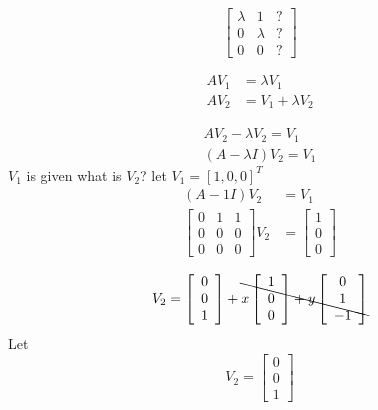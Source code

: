 \documentclass[12pt,a4paper]{article}
\begin{document}
$$
\left[\begin{array}{lll}
{\lambda} & {1} & ?\\ 
{0} & {\lambda}&  ?\\ 
{0} & {0} &? 
\end{array}\right]
$$

\begin{align*}
A V_{1}&=\lambda V_{1} \\
 A V_{2}&=V_{1}+\lambda V_{2}
\end{align*}

\begin{equation*}
\begin{array}{l}{A V_{2}-\lambda V_{2}=V_{1}} \\ {(A-\lambda I) V_{2}=V_{1}}\end{array}
\end{equation*}
$V_1$ is given what is $V_2$? let $V_1=[1,0,0]^T$
\begin{align*}
(A-1 I) V_{2}&=V_{1}\\
\left[\begin{array}{lll}{0} & {1} & {1} \\ {0} & {0} & {0} \\ {0} & {0} & {0}\end{array}\right] V_{2}&=\left[\begin{array}{l}{1} \\ {0} \\ {0}\end{array}\right]
\end{align*}

\begin{equation}
V_{2}=\left[\begin{array}{l}{0} \\ {0} \\ {1}\end{array}\right]+\bcancel{x\left[\begin{array}{l}{1} \\ {0} \\ {0}\end{array}\right]+y\left[\begin{array}{c}{0} \\ {1} \\ {-1}\end{array}\right]}
\end{equation}
Let 
\begin{equation}
V_{2}=\left[\begin{array}{l}{0} \\ {0} \\ {1}\end{array}\right]
\end{equation}
\end{document}
